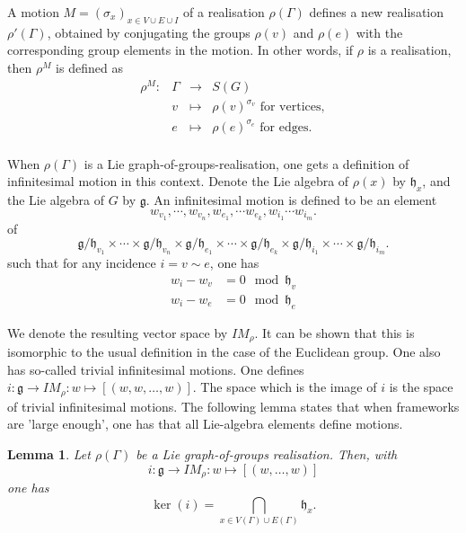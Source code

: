 \documentclass{article}
\newtheorem{lemma}[theorem]{Lemma}
\theoremstyle{definition}
\theoremstyle{remark}
\begin{document}
A motion $M=(\sigma_x)_{x\in V\cup E \cup I}$ of a realisation $\rho(\Gamma)$ defines a new realisation $\rho'(\Gamma)$, obtained by conjugating the groups $\rho(v)$ and $\rho(e)$ with the corresponding group elements in the motion. 
In other words, if $\rho$ is a realisation, then  $\rho^{M}$ is defined as
$$\begin{array}{rccl}
    \rho^{M}:& \Gamma &\rightarrow &S(G)\\
    &v&\mapsto &\rho(v)^{\sigma_v} \text{ for vertices}, \\ 
    &e&\mapsto &\rho(e)^{\sigma_e} \text{ for edges}. \\ 
\end{array}$$

When $\rho(\Gamma)$ is a Lie graph-of-groups-realisation, one gets a definition of infinitesimal motion in this context. Denote the Lie algebra of $\rho(x)$ by $\mathfrak{h}_x$, and the Lie algebra of $G$ by $\mathfrak{g}$. An infinitesimal motion is defined to be an element $$w_{v_1}, \cdots, w_{v_n}, w_{e_1}, \cdots w_{e_k}, w_{i_1} \cdots w_{i_m} .$$ of
\begin{equation*}
    \mathfrak{g}/\mathfrak{h}_{v_1} \times \cdots \times \mathfrak{g}/\mathfrak{h}_{v_n} \times \mathfrak{g}/\mathfrak{h}_{e_1} \times \cdots \times \mathfrak{g}/\mathfrak{h}_{e_k} \times  \mathfrak{g}/\mathfrak{h}_{i_1} \times \cdots \times  \mathfrak{g}/\mathfrak{h}_{i_m} .
\end{equation*}
such that for any incidence $i=v \sim e$, one has
\begin{align*}
    w_i - w_v &= 0 \mod \mathfrak{h}_v\\
    w_i - w_e &= 0 \mod \mathfrak{h}_e
\end{align*}

We denote the resulting vector space by $IM_\rho$. It can be shown that this is isomorphic to the usual definition \cite[Theorem 4.8]{graphsofgroups} in the case of the Euclidean group. One also has so-called trivial infinitesimal motions. One defines $i: \mathfrak{g}\rightarrow IM_\rho:  w\mapsto [(w, w, \dots, w)]$. The space which is the image of $i$ is the space of trivial infinitesimal motions. The following lemma states that when frameworks are 'large enough', one has that all Lie-algebra elements define motions. 

\begin{lemma}\label{lem: Trivial_motions}
Let $\rho(\Gamma)$ be a Lie graph-of-groups realisation. Then, with $$i: \mathfrak{g}\rightarrow IM_\rho:  w\mapsto [(w, \dots, w)]$$ one has $$\ker(i) = \bigcap_{x\in V(\Gamma)\cup E(\Gamma)} \mathfrak{h}_{x}.$$
\end{lemma}
\end{document}
